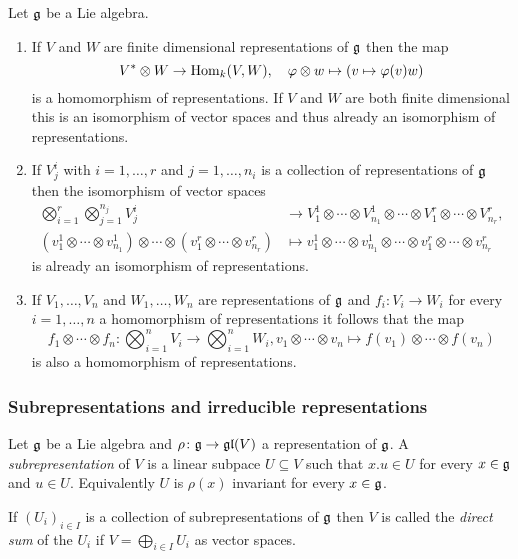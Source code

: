 \begin{prop}
 Let $\mathfrak{g}$ be a Lie algebra.
 \begin{enumerate}[leftmargin=*]
  \item
   If $V$ and $W$ are finite dimensional representations of $\mathfrak{g}$ then the map
   \[
    V^* \otimes W \to \operatorname{Hom}_k(V,W), \quad \varphi \otimes w \mapsto (v \mapsto \varphi(v) w)
   \]
   is a homomorphism of representations. If $V$ and $W$ are both finite dimensional this is an isomorphism of vector spaces and thus already an isomorphism of representations.
  \item
   If $V^i_j$ with $i = 1, \dotsc, r$ and $j = 1, \dotsc, n_i$ is a collection of representations of $\mathfrak{g}$ then the isomorphism of vector spaces
   \begin{align*}
    \bigotimes_{i=1}^r \bigotimes_{j=1}^{n_j} V^{i}_j
    &\to V^1_1 \otimes \dotsb \otimes V^1_{n_1} \otimes \dotsb \otimes V^r_1 \otimes \dotsb \otimes V^{r}_{n_r}, \\
    (v^1_1 \otimes \dotsb \otimes v^1_{n_1}) \otimes \dotsb \otimes (v^r_1 \otimes \dotsb \otimes v^r_{n_r})
    &\mapsto v^1_1 \otimes \dotsb \otimes v^1_{n_1} \otimes \dotsb \otimes v^r_1 \otimes \dotsb \otimes v^r_{n_r}
   \end{align*}
   is already an isomorphism of representations.
  \item
   If $V_1, \dotsc, V_n$ and $W_1, \dotsc, W_n$ are representations of $\mathfrak{g}$ and $f_i \colon V_i \to W_i$ for every $i = 1, \dotsc, n$ a homomorphism of representations it follows that the map
   \[
    f_1 \otimes \dotsb \otimes f_n \colon \bigotimes_{i=1}^n V_i \to \bigotimes_{i=1}^n W_i,
    v_1 \otimes \dotsb \otimes v_n \mapsto f(v_1) \otimes \dotsb \otimes f(v_n)
   \]
   is also a homomorphism of representations.
 \end{enumerate}
\end{prop}


\subsubsection{Subrepresentations and irreducible representations}


\begin{defi}
 Let $\mathfrak{g}$ be a Lie algebra and $\rho \colon \mathfrak{g} \to \mathfrak{gl}(V)$ a representation of $\mathfrak{g}$. A \emph{subrepresentation} of $V$ is a linear subpace $U \subseteq V$ such that $x.u \in U$ for every $x \in \mathfrak{g}$ and $u \in U$. Equivalently $U$ is $\rho(x)$ invariant for every $x \in \mathfrak{g}$.
 
 If $(U_i)_{i \in I}$ is a collection of subrepresentations of $\mathfrak{g}$ then $V$ is called the \emph{direct sum} of the $U_i$ if $V = \bigoplus_{i \in I} U_i$ as vector spaces.
\end{defi}


